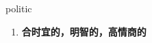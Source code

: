 
\begin{frame}
{\huge politic}
\begin{center}
\begin{enumerate}\Large
  \item \textbf{合时宜的，明智的，高情商的}
\end{enumerate}
\end{center}
\end{frame}
